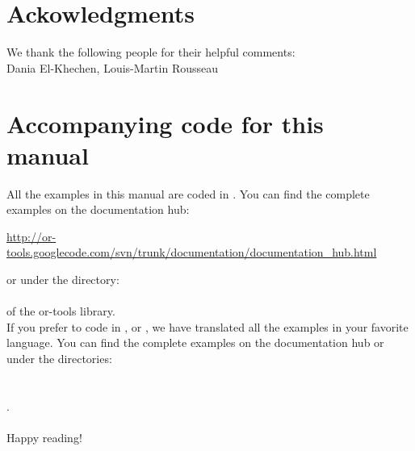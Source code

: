 {\begin{titlepage}
\section*{Ackowledgments}
We thank the following people for their helpful comments:\\
Dania El-Khechen, Louis-Martin Rousseau

\section*{Accompanying code for this manual}

All the examples in this manual are coded in . You can find the complete examples on the documentation hub:\\

\begin{center}
  \url{http://or-tools.googlecode.com/svn/trunk/documentation/documentation_hub.html}
\end{center}

or under the directory:\\

\\

of the or-tools library.\\

If you prefer to code in ,  or , we have translated all the examples in your favorite language. You can find the complete examples on the documentation hub or under the directories:\\

\\
\\
.\\

~\\
{\Large Happy reading!}
\end{titlepage}
}

